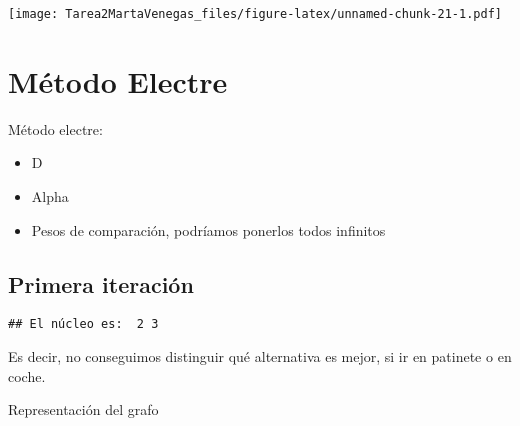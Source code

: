 \documentclass[
]{article}
\newenvironment{Shaded}{\begin{snugshade}}{\end{snugshade}}
\newcommand{\AttributeTok}[1]{\textcolor[rgb]{0.77,0.63,0.00}{#1}}
\newcommand{\ConstantTok}[1]{\textcolor[rgb]{0.00,0.00,0.00}{#1}}
\newcommand{\DecValTok}[1]{\textcolor[rgb]{0.00,0.00,0.81}{#1}}
\newcommand{\FloatTok}[1]{\textcolor[rgb]{0.00,0.00,0.81}{#1}}
\newcommand{\FunctionTok}[1]{\textcolor[rgb]{0.00,0.00,0.00}{#1}}
\newcommand{\NormalTok}[1]{#1}
\newcommand{\OtherTok}[1]{\textcolor[rgb]{0.56,0.35,0.01}{#1}}
\newcommand{\SpecialCharTok}[1]{\textcolor[rgb]{0.00,0.00,0.00}{#1}}
\newcommand{\StringTok}[1]{\textcolor[rgb]{0.31,0.60,0.02}{#1}}
\providecommand{\tightlist}{%
  \setlength{\itemsep}{0pt}\setlength{\parskip}{0pt}}
\begin{document}
\texttt{[image: Tarea2MartaVenegas\_files/figure-latex/unnamed-chunk-21-1.pdf]}

\hypertarget{muxe9todo-electre}{%
\section{Método Electre}\label{muxe9todo-electre}}

Método electre:

\begin{itemize}
\tightlist
\item
  D
\item
  Alpha
\item
  Pesos de comparación, podríamos ponerlos todos infinitos
\end{itemize}

\hypertarget{primera-iteraciuxf3n}{%
\subsection{Primera iteración}\label{primera-iteraciuxf3n}}

\begin{Shaded}
\end{Shaded}

\begin{verbatim}
## El núcleo es:  2 3
\end{verbatim}

Es decir, no conseguimos distinguir qué alternativa es mejor, si ir en
patinete o en coche.

Representación del grafo
\end{document}
